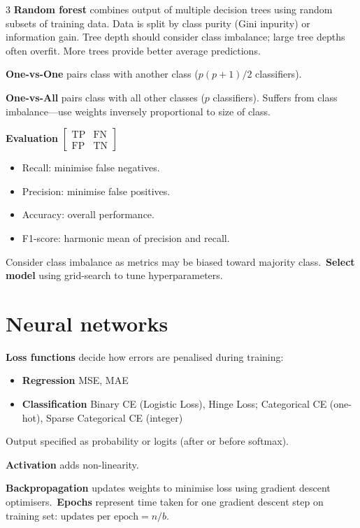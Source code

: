 \documentclass{article}
\begin{document}
\begin{multicols}{3}
    \textbf{Random forest} combines output of multiple decision trees
    using random subsets of training data. Data is split by class purity
    (Gini inpurity) or information gain. Tree depth should consider
    class imbalance; large tree depths often overfit. More trees provide
    better average predictions.

    \textbf{One-vs-One} pairs class with another class (\(p \left( p + 1 \right)/2\) classifiers).

    \textbf{One-vs-All} pairs class with all other classes (\(p\) classifiers).
    Suffers from class imbalance---use weights inversely proportional to size
    of class.

    \textbf{Evaluation} \(
    \begin{bmatrix}
        \text{TP} & \text{FN} \\
        \text{FP} & \text{TN}
    \end{bmatrix}
    \)
    \begin{itemize}
        \item Recall: minimise false negatives.
        \item Precision: minimise false positives.
        \item Accuracy: overall performance.
        \item F1-score: harmonic mean of precision and recall.
    \end{itemize}
    Consider class imbalance as metrics may be biased toward
    majority class.\ \textbf{Select model} using grid-search to tune
    hyperparameters.
    \section{Neural networks}
    \textbf{Loss functions} decide how errors are penalised during training:
    \begin{itemize}
        \item \textbf{Regression} MSE, MAE
        \item \textbf{Classification} Binary CE (Logistic Loss), Hinge Loss;
              Categorical CE (one-hot), Sparse Categorical CE (integer)
    \end{itemize}
    Output specified as probability or logits (after or before softmax).

    \textbf{Activation} adds non-linearity.

    \textbf{Backpropagation} updates weights to minimise loss using
    gradient descent optimisers.\ \textbf{Epochs} represent time taken
    for one gradient descent step on training set:
    \(\text{updates per epoch} = n/b\).


\end{multicols}
\end{document}
